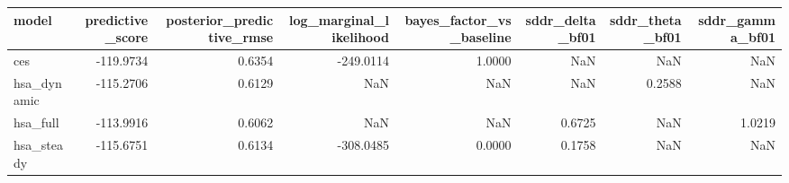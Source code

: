 \begin{tabular}{lrrrrrrr}
\toprule
model & predictive\_score & posterior\_predictive\_rmse & log\_marginal\_likelihood & bayes\_factor\_vs\_baseline & sddr\_delta\_bf01 & sddr\_theta\_bf01 & sddr\_gamma\_bf01 \\
\midrule
ces & -119.9734 & 0.6354 & -249.0114 & 1.0000 & NaN & NaN & NaN \\
hsa\_dynamic & -115.2706 & 0.6129 & NaN & NaN & NaN & 0.2588 & NaN \\
hsa\_full & -113.9916 & 0.6062 & NaN & NaN & 0.6725 & NaN & 1.0219 \\
hsa\_steady & -115.6751 & 0.6134 & -308.0485 & 0.0000 & 0.1758 & NaN & NaN \\
\bottomrule
\end{tabular}
